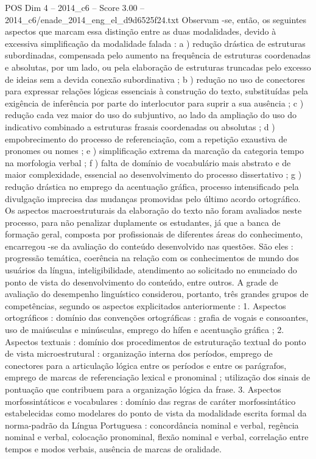 \begin{textsample}{POS Dim 4 – 2014\_c6 – Score 3.00 – 2014\_c6/enade\_2014\_eng\_el\_d9d6525f24.txt}
Observam -se, então, os seguintes aspectos que marcam essa distinção entre as duas modalidades, devido à excessiva simplificação da modalidade falada : a ) redução drástica de estruturas subordinadas, compensada pelo aumento na frequência de estruturas coordenadas e absolutas, por um lado, ou pela elaboração de estruturas truncadas pelo excesso de ideias sem a devida conexão subordinativa ; b ) redução no uso de conectores para expressar relações lógicas essenciais à construção do texto, substituídas pela exigência de inferência por parte do interlocutor para suprir a sua ausência ; c ) redução cada vez maior do uso do subjuntivo, ao lado da ampliação do uso do indicativo combinado a estruturas frasais coordenadas ou absolutas ; d ) empobrecimento do processo de referenciação, com a repetição exaustiva de pronomes ou nomes ; e ) simplificação extrema da marcação da categoria tempo na morfologia verbal ; f ) falta de domínio de vocabulário mais abstrato e de maior complexidade, essencial ao desenvolvimento do processo dissertativo ; g ) redução drástica no emprego da acentuação gráfica, processo intensificado pela divulgação imprecisa das mudanças promovidas pelo último acordo ortográfico.
Os aspectos macroestruturais da elaboração do texto não foram avaliados neste processo, para não penalizar duplamente os estudantes, já que a banca de formação geral, composta por profissionais de diferentes áreas do conhecimento, encarregou -se da avaliação do conteúdo desenvolvido nas questões.
São eles : progressão temática, coerência na relação com os conhecimentos de mundo dos usuários da língua, inteligibilidade, atendimento ao solicitado no enunciado do ponto de vista do desenvolvimento do conteúdo, entre outros.
A grade de avaliação do desempenho linguístico considerou, portanto, três grandes grupos de competências, segundo os aspectos explicitados anteriormente : 1.
Aspectos ortográficos : domínio das convenções ortográficas : grafia de vogais e consoantes, uso de maiúsculas e minúsculas, emprego do hífen e acentuação gráfica ; 2.
Aspectos textuais : domínio dos procedimentos de estruturação textual do ponto de vista microestrutural : organização interna dos períodos, emprego de conectores para a articulação lógica entre os períodos e entre os parágrafos, emprego de marcas de referenciação lexical e pronominal ; utilização dos sinais de pontuação que contribuem para a organização lógica da frase. 3.
Aspectos morfossintáticos e vocabulares : domínio das regras de caráter morfossintático estabelecidas como modelares do ponto de vista da modalidade escrita formal da norma-padrão da Língua Portuguesa : concordância nominal e verbal, regência nominal e verbal, colocação pronominal, flexão nominal e verbal, correlação entre tempos e modos verbais, ausência de marcas de oralidade.

\end{textsample}

